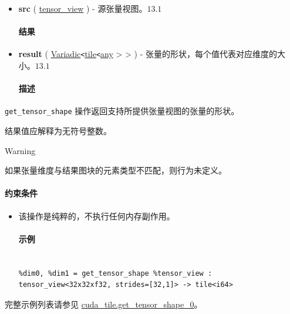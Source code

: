 \documentclass{article}
\begin{document}
\begin{itemize}
\item \textbf{src} ( \href{https://docs.nvidia.com/cuda/tile-ir/latest/sections/types.html#type-tensor-view}{tensor\_view} ) - 源张量视图。$\boxed{13.1}$




\paragraph{结果}


\item \textbf{result} ( \href{https://docs.nvidia.com/cuda/tile-ir/latest/sections/operations.html#type-variadic}{Variadic}\texttt{<}\href{https://docs.nvidia.com/cuda/tile-ir/latest/sections/types.html#type-tile}{tile}\texttt{<}\href{https://docs.nvidia.com/cuda/tile-ir/latest/sections/operations.html#type-any}{any} > > ) - 张量的形状，每个值代表对应维度的大小。$\boxed{13.1}$




\paragraph{描述}


\end{itemize}
\texttt{get\_tensor\_shape} 操作返回支持所提供张量视图的张量的形状。



结果值应解释为无符号整数。



Warning




如果张量维度与结果图块的元素类型不匹配，则行为未定义。





\paragraph{约束条件}


\begin{itemize}
\item 该操作是纯粹的，不执行任何内存副作用。




\paragraph{示例}


\begin{lstlisting}

%dim0, %dim1 = get_tensor_shape %tensor_view : tensor_view<32x32xf32, strides=[32,1]> -> tile<i64>

\end{lstlisting}



\end{itemize}
完整示例列表请参见 \href{https://docs.nvidia.com/cuda/tile-ir/latest/sections/appendix.html#example-cuda-tile-get-tensor-shape-0}{cuda\_tile.get\_tensor\_shape\_0}。
\end{document}
